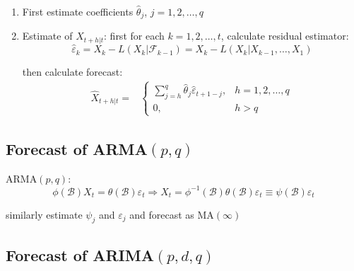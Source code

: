     \begin{enumerate}[topsep=2pt,itemsep=2pt]
        \item First estimate coefficients $ \hat{\theta  }_j $, $ j=1,2,\ldots,q $
        \item Estimate of $ X_{t+h|t} $: first for each $ k=1,2,\ldots,t $, calculate residual estimator:
        \begin{equation}
            \hat{\varepsilon }_{k}=X_{k}-L(X_{k}|\mathscr{F}_{k-1})= X_{k}-L(X_{k}|X_{k-1},\ldots,X_{1})
        \end{equation}
        
        then calculate forecast:
        \begin{align}
            \hat{X}_{t+h|t}=&\begin{cases}
                \sum_{j=h}^q\hat{\theta }_j\hat{\varepsilon }_{t+1-j},&h=1,2,\ldots,q\\
                0,&h>q
            \end{cases}
        \end{align}

    \end{enumerate}
    
\subsection{Forecast of ARMA$ (p,q) $}
    ARMA$ (p,q) $:
    \begin{equation}
        \phi (\mathscr{B} )X_t=\theta (\mathscr{B} )\varepsilon _t\Rightarrow X_t=\phi ^{-1}(\mathscr{B} )\theta (\mathscr{B} )\varepsilon _t\equiv \psi (\mathscr{B} )\varepsilon _t
    \end{equation}
        
    similarly estimate $ \psi _j $ and $ \varepsilon _j $ and forecast as MA$ (\infty) $
    
        
\subsection{Forecast of ARIMA$ (p,d,q) $}
    


    
        
    
    
    
    
    
    
    
